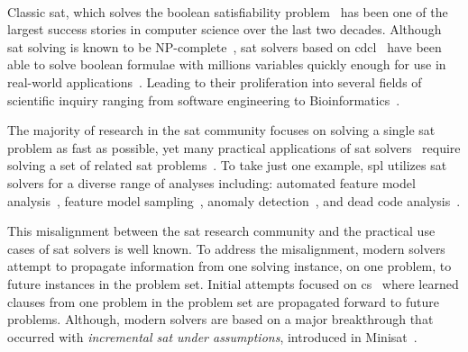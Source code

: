 ~\label{sec:introduction}


Classic \ac{sat}, which solves the boolean satisfiability
problem~\cite{10.5555/1550723} has been one of the largest success stories in
computer science over the last two decades. Although \ac{sat} solving is known
to be NP-complete~\cite{10.1145/800157.805047}, \ac{sat} solvers based on
\ac{cdcl}~\cite{Marques-Silva:1999:GSA:304491.304506,Silva:1997:GNS:244522.244560,10.5555/1867406.1867438}
have been able to solve boolean formulae with millions variables quickly enough
for use in real-world applications~\cite{10.5555/1557461}. Leading to their
proliferation into several fields of scientific inquiry ranging from software
engineering to
Bioinformatics~\cite{10.1007/11814948_16,10.1007/978-3-642-31612-8_12}.

The majority of research in the \ac{sat} community focuses on solving a single
\ac{sat} problem as fast as possible, yet many practical applications of
\ac{sat}
solvers~\cite{silva1997robust,10.1007/3-540-44798-9_4,10.1145/378239.379019,10.1145/1698759.1698762,Een_asingle-instance,een2003temporal,10.5555/1998496.1998520}
require solving a set of related \ac{sat}
problems~\cite{10.1007/3-540-44798-9_4, silva1997robust, een2003temporal}. To
take just one example, \ac{spl} utilizes \ac{sat} solvers for a diverse range of
analyses including: automated feature model
analysis~\cite{useBTRC05,GBT+19,TAK+:CSUR14}, feature model
sampling~\cite{MKR+:ICSE16,VAT+:SPLC18}, anomaly
detection~\cite{AKTS:FOSD16,KAT:TR16,MNS+:SPLC17}, and dead code
analysis~\cite{TLSS:EuroSys11}.

This misalignment between the \ac{sat} research community and the practical use
cases of \ac{sat} solvers is well known. To address the misalignment, modern
solvers attempt to propagate information from one solving instance, on one
problem, to future instances in the problem set. Initial attempts focused on
\ac{cs}~\cite{10.1007/3-540-44798-9_4,10.1145/378239.379019} where learned
clauses from one problem in the problem set are propagated forward to future
problems. Although, modern solvers are based on a major breakthrough that
occurred with \emph{incremental \ac{sat} under assumptions}, introduced in
Minisat~\cite{10.1007/978-3-540-24605-3_37}.

